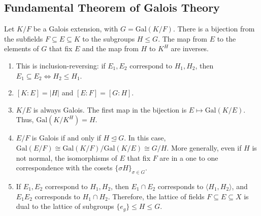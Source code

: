 \documentclass[10pt]{extarticle}
\newcommand{\Q}{\mathbb{Q}}
\begin{document}
\begin{enumerate}[(1)]
\begin{center}
      \end{center}
  \end{enumerate}
  \subsection{Fundamental Theorem of Galois Theory}%
  Let $K/F$ be a Galois extension, with $G = \text{Gal}(K/F)$. There is a bijection from the subfields $F\subseteq E\subseteq K$ to the subgroups $H\leq G$. The map from $E$ to the elements of $G$ that fix $E$ and the map from $H$ to $K^{H}$ are inverses.
  \begin{enumerate}[(1)]
    \item This is inclusion-reversing: if $E_1,E_2$ correspond to $H_1,H_2$, then $E_1\subseteq E_2 \Leftrightarrow H_2\leq H_1$.
    \item $[K:E] = |H|$ and $[E:F] = [G:H]$.
    \item $K/E$ is always Galois. The first map in the bijection is $E\mapsto \text{Gal}(K/E)$. Thus, $\text{Gal}(K/K^{H}) = H$.
    \item $E/F$ is Galois if and only if $H\trianglelefteq G$. In this case, $\text{Gal}(E/F) \cong \text{Gal}(K/F)/\text{Gal}(K/E) \cong G/H$. More generally, even if $H$ is not normal, the isomorphisms of $E$ that fix $F$ are in a one to one correspondence with the cosets $\{\sigma H\}_{\sigma\in G}$.
    \item If $E_1,E_2$ correspond to $H_1,H_2$, then $E_1\cap E_2$ corresponds to $\langle H_1,H_2\rangle$, and $E_1E_2$ corresponds to $H_1\cap H_2$. Therefore, the lattice of fields $F\subseteq E\subseteq X$ is dual to the lattice of subgroups $\{e_g\}\leq H\leq G$.
  \end{enumerate}
\end{document}
